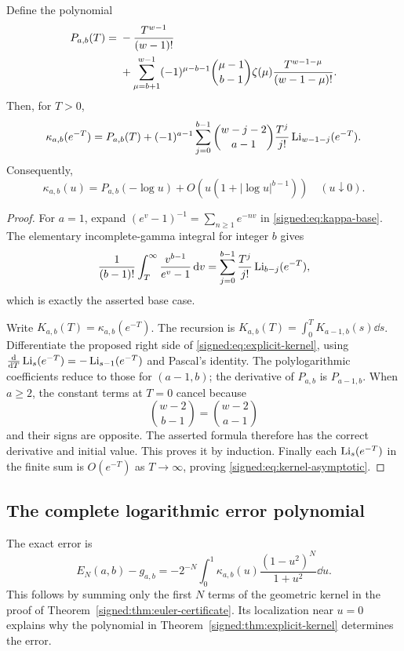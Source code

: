 \begin{theorem}\label{signed:thm:explicit-kernel}
Define the polynomial
\begin{align}\label{signed:eq:P-ab}
 P_{a,b}(T)={}&-\frac{T^{w-1}}{(w-1)!}\notag\\
 &+\sum_{\mu=b+1}^{w-1}(-1)^{\mu-b-1}\binom{\mu-1}{b-1}
       \zeta(\mu)\frac{T^{w-1-\mu}}{(w-1-\mu)!}.
\end{align}
Then, for $T>0$,
\begin{align}\label{signed:eq:explicit-kernel}
 \kappa_{a,b}(e^{-T})=P_{a,b}(T)
 +(-1)^{a-1}\sum_{j=0}^{b-1}\binom{w-j-2}{a-1}
       \frac{T^j}{j!}\operatorname{Li}_{w-1-j}(e^{-T}).
\end{align}
Consequently,
\begin{equation}\label{signed:eq:kernel-asymptotic}
 \kappa_{a,b}(u)=P_{a,b}(-\log u)
       +O\!\left(u(1+|\log u|^{b-1})\right)\quad(u\downarrow0).
\end{equation}
\end{theorem}
\begin{proof}
For $a=1$, expand $(e^v-1)^{-1}=\sum_{n\ge1}e^{-nv}$ in \eqref{signed:eq:kappa-base}. The elementary incomplete-gamma integral for integer $b$ gives
\[
 \frac1{(b-1)!}\int_T^\infty\frac{v^{b-1}}{e^v-1}\,\mathrm d v
 =\sum_{j=0}^{b-1}\frac{T^j}{j!}\operatorname{Li}_{b-j}(e^{-T}),
\]
which is exactly the asserted base case.

Write $K_{a,b}(T)=\kappa_{a,b}(e^{-T})$. The recursion is
$K_{a,b}(T)=\int_0^T K_{a-1,b}(s)\dd s$. Differentiate the proposed right side of \eqref{signed:eq:explicit-kernel}, using
$\frac{\mathrm d}{\mathrm dT}\operatorname{Li}_s(e^{-T})=-\operatorname{Li}_{s-1}(e^{-T})$ and Pascal's identity. The polylogarithmic coefficients reduce to those for $(a-1,b)$; the derivative of $P_{a,b}$ is $P_{a-1,b}$. When $a\ge2$, the constant terms at $T=0$ cancel because
\[
 \binom{w-2}{b-1}=\binom{w-2}{a-1}
\]
and their signs are opposite. The asserted formula therefore has the correct derivative and initial value. This proves it by induction. Finally each $\operatorname{Li}_s(e^{-T})$ in the finite sum is $O(e^{-T})$ as $T\to\infty$, proving \eqref{signed:eq:kernel-asymptotic}.
\end{proof}

\subsection{The complete logarithmic error polynomial}
The exact error is
\begin{equation}\label{signed:eq:exact-error}
 E_N(a,b)-g_{a,b}
 =-2^{-N}\int_0^1\kappa_{a,b}(u)
                    \frac{(1-u^2)^N}{1+u^2}\dd u.
\end{equation}
This follows by summing only the first $N$ terms of the geometric kernel in the proof of Theorem~\ref{signed:thm:euler-certificate}. Its localization near $u=0$ explains why the polynomial in Theorem~\ref{signed:thm:explicit-kernel} determines the error.

